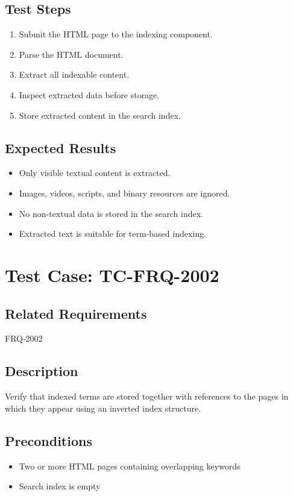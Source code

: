 \documentclass{article}
\begin{document}
\subsection*{Test Steps}
\begin{enumerate}
  \item Submit the HTML page to the indexing component.
  \item Parse the HTML document.
  \item Extract all indexable content.
  \item Inspect extracted data before storage.
  \item Store extracted content in the search index.
\end{enumerate}

\subsection*{Expected Results}
\begin{itemize}
  \item Only visible textual content is extracted.
  \item Images, videos, scripts, and binary resources are ignored.
  \item No non-textual data is stored in the search index.
  \item Extracted text is suitable for term-based indexing.
\end{itemize}

\section{Test Case: TC-FRQ-2002}

\subsection*{Related Requirements}
FRQ-2002

\subsection*{Description}
Verify that indexed terms are stored together with references to the pages
in which they appear using an inverted index structure.

\subsection*{Preconditions}
\begin{itemize}
  \item Two or more HTML pages containing overlapping keywords
  \item Search index is empty
\end{itemize}
\end{document}
